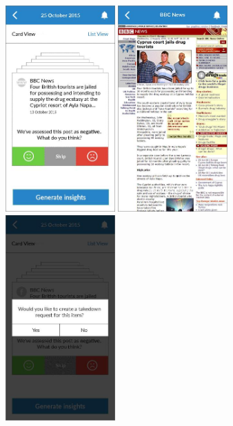 \begin{figure}
  \subfigures
  \centering
  \begin{minipage}{4.6cm}
    \centering
    \includegraphics[width=4.2cm]{inc/ui_takedown_step1.jpg}
    \caption{}
    \label{fig:ui_takedown_step1}
  \end{minipage}
  \begin{minipage}{4.6cm}
    \centering
    \includegraphics[width=4.2cm]{inc/ui_takedown_step2.jpg}
    \caption{}
    \label{fig:ui_takedown_step2}
  \end{minipage}
  \begin{minipage}{4.6cm}
    \centering
    \includegraphics[width=4.2cm]{inc/ui_takedown_step3.jpg}
    \caption{}
    \label{fig:ui_takedown_step3}
  \end{minipage}
\end{figure}

